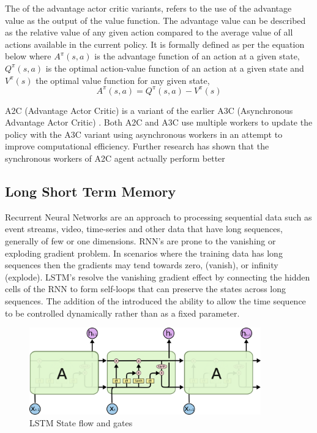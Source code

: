 \documentclass[oneside,12pt]{Classes/RoboticsLaTeX}
\begin{document}
The  of the advantage actor critic variants, refers to the use of the  advantage value as the output of the value function. The advantage value can be described as the relative value of any given action compared to the average value of all actions available in the current policy. It is formally defined as per the equation below where \(A^\pi(s,a)\) is the advantage function of an action at a given state, \(Q^\pi(s,a)\) is the optimal action-value function of an action at a given state and \(V^\pi(s)\) the optimal value function for any given state,
\[A^\pi(s,a) = Q^\pi(s,a) - V^\pi(s) \]

A2C (Advantage Actor Critic) \citet{YuhuaiWu17a2c} is a variant of the earlier A3C (Asynchronous Advantage Actor Critic) \citet{mnih2016asynchronous}. Both A2C and A3C use multiple workers to update the policy with the A3C variant using asynchronous workers in an attempt to improve computational efficiency. Further research \citep{YuhuaiWu17a2c} has shown that the synchronous workers of A2C agent actually perform better  \citep{YuhuaiWu17a2c}

\subsection{Long Short Term Memory} \label{section:lstm}
Recurrent Neural Networks \citep{RumelhartDavidE1986Lrbb} are an approach to processing sequential data such as event streams, video, time-series and other data that have long sequences, generally of few or one dimensions.  RNN's are prone to the vanishing or exploding gradient problem. In scenarios where the training data has long sequences then the gradients may tend towards zero, (vanish), or infinity (explode).  LSTM's \citep{Hochreiter1997}  resolve the vanishing gradient effect by connecting the hidden cells of the RNN to form  self-loops that can preserve the states across long sequences. The addition of the  \citet{GersFelixA2000LtFC} introduced the ability to allow the time sequence to be controlled dynamically rather than as a fixed parameter.
\begin{figure}[h]
    \centering
    \includegraphics[width=100mm]{Figures/LSTM.png}
    \caption{LSTM State flow and gates}
    \label{fig:lstm}
\end{figure}
\end{document}
